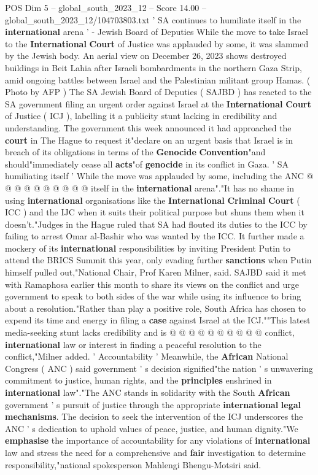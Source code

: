 \begin{textsample}{POS Dim 5 – global\_south\_2023\_12 – Score 14.00 – global\_south\_2023\_12/104703803.txt}  \label{ex:f5_pos_218}
' SA continues to humiliate itself in the \textbf{international} arena ' - Jewish Board of Deputies While the move to take Israel to the \textbf{International} \textbf{Court} of Justice was applauded by some, it was slammed by the Jewish body.
An aerial view on December 26, 2023 shows destroyed buildings in Beit Lahia after Israeli bombardments in the northern Gaza Strip, amid ongoing battles between Israel and the Palestinian militant group Hamas. ( Photo by AFP ) The SA Jewish Board of Deputies ( SAJBD ) has reacted to the SA government filing an urgent order against Israel at the \textbf{International} \textbf{Court} of Justice ( ICJ ), labelling it a publicity stunt lacking in credibility and understanding.
The government this week announced it had approached the \textbf{court} in The Hague to request it"declare on an urgent basis that Israel is in breach of its obligations in terms of the \textbf{Genocide} \textbf{Convention}"and should"immediately cease all \textbf{acts}"of \textbf{genocide} in its conflict in Gaza. ' SA humiliating itself ' While the move was applauded by some, including the ANC @ @ @ @ @ @ @ @ @ @ itself in the \textbf{international} arena"."It has no shame in using \textbf{international} organisations like the \textbf{International} \textbf{Criminal} \textbf{Court} ( ICC ) and the IJC when it suits their political purpose but shuns them when it doesn't."Judges in the Hague ruled that SA had flouted its duties to the ICC by failing to arrest Omar al-Bashir who was wanted by the ICC.
It further made a mockery of its \textbf{international} responsibilities by inviting President Putin to attend the BRICS Summit this year, only evading further \textbf{sanctions} when Putin himself pulled out,"National Chair, Prof Karen Milner, said.
SAJBD said it met with Ramaphosa earlier this month to share its views on the conflict and urge government to speak to both sides of the war while using its influence to bring about a resolution."Rather than play a positive role, South Africa has chosen to expend its time and energy in filing a \textbf{case} against Israel at the ICJ.""This latest media-seeking stunt lacks credibility and is @ @ @ @ @ @ @ @ @ @ conflict, \textbf{international} law or interest in finding a peaceful resolution to the conflict,"Milner added. ' Accountability ' Meanwhile, the \textbf{African} National Congress ( ANC ) said government ' s decision signified"the nation ' s unwavering commitment to justice, human rights, and the \textbf{principles} enshrined in \textbf{international} law"."The ANC stands in solidarity with the South \textbf{African} government ' s pursuit of justice through the appropriate \textbf{international} \textbf{legal} \textbf{mechanisms}.
The decision to seek the intervention of the ICJ underscores the ANC ' s dedication to uphold values of peace, justice, and human dignity."We \textbf{emphasise} the importance of accountability for any violations of \textbf{international} law and stress the need for a comprehensive and \textbf{fair} investigation to determine responsibility,"national spokesperson Mahlengi Bhengu-Motsiri said.


\end{textsample}
